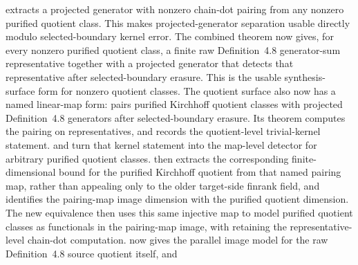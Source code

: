 \documentclass[11pt]{article}
\begin{document}
\begin{itemize}
extracts a projected generator with nonzero chain-dot pairing from any nonzero
purified quotient class.  This makes projected-generator separation usable
directly modulo selected-boundary kernel error.
The combined theorem
now gives, for every nonzero purified quotient class, a finite raw
Definition~4.8 generator-sum representative together with a projected generator
that detects that representative after selected-boundary erasure.  This is the
usable synthesis-surface form for nonzero quotient classes.
The quotient surface also now has a named linear-map form:
pairs purified Kirchhoff quotient classes with projected Definition~4.8
generators after selected-boundary erasure.  Its  theorem
computes the pairing on representatives, and
records the quotient-level trivial-kernel statement.
and
turn that kernel statement into the map-level detector for arbitrary purified
quotient classes.
then extracts the corresponding finite-dimensional bound for the purified
Kirchhoff quotient from that named pairing map, rather than appealing only to
the older target-side finrank field, and
identifies the pairing-map image dimension with the purified quotient
dimension.  The new equivalence
then uses this same injective map to model purified quotient classes as
functionals in the pairing-map image, with
retaining the representative-level chain-dot computation.
now gives the parallel image model for the raw Definition~4.8 source quotient
itself, and

\end{itemize}
\end{document}
